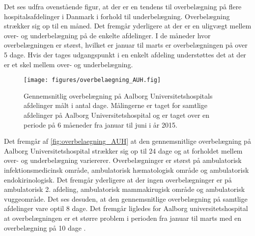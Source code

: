 \noindent
Det ses udfra ovenstående figur, at der er en tendens til overbelægning på flere hospitalsafdelinger i Danmark i forhold til underbelægning. Overbelægning strækker sig op til en måned. Det fremgår yderligere at der er en uligvægt mellem over- og underbelægning på de enkelte afdelinger. I de måneder hvor overbelægningen er størst, hvilket er januar til marts er overbelægningen på over 5 dage. Hvis der tages udgangspunkt i en enkelt afdeling understøttes det at der er et skel mellem over- og underbelægning.\citep{SDS2015}      

\begin{figure}[H]
\centering
\texttt{[image: figures/overbelaegning\_AUH.fig]}
\caption{Gennemsnitlig overbelægning på Aalborg Universitetshospitals afdelinger målt i antal dage. Målingerne er taget for samtlige afdelinger på Aalborg Universitetshospital og er taget over en periode på 6 måeneder fra januar til juni i år 2015.\citep{SDS2015}}
\label{fig:overbelaegning_AUH}
\end{figure}

\noindent
Det fremgår af \autoref{fig:overbelaegning_AUH} at den gennemsnitlige overbelægning på Aalborg Universitetshospital strækker sig op til 24 dage og at forholdet mellem over- og underbelægning variererer. Overbelægninger er størst på ambulatorisk infektionsmedicinsk område, ambulatorisk hæmatologisk område og ambulatorisk endokirinologisk. Det fremgår yderligere at der ingen overbelægninger er på ambulatorisk 2. afdeling, ambulatorisk mammakirugisk  område og ambulatorisk vuggeområde. Det ses desuden, at den gennemsnitlige overbelægning på samtlige afdelinger vare optil 8 dage. Det fremgår ligledes for Aalborg universitetshospital at overbelægningen er et større problem i perioden fra januar til marts med en overbelægning på 10 dage \citep{SDS2015}.    





